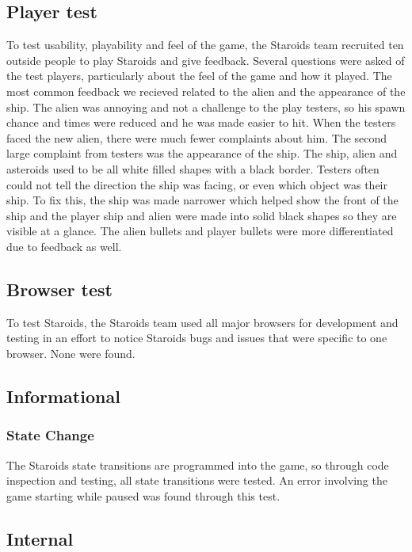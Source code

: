 \documentclass[12pt, titlepage]{article}
\begin{document}
\subsection{Player test}
To test usability, playability and feel of the game, the Staroids team recruited ten outside people to play Staroids and give feedback. Several questions were asked of the test players, particularly about the feel of the game and how it played. The most common feedback we recieved related to the alien and the appearance of the ship. The alien was annoying and not a challenge to the play testers, so his spawn chance and times were reduced and he was made easier to hit. When the testers faced the new alien, there were much fewer complaints about him. The second large complaint from testers was the appearance of the ship. The ship, alien and asteroids used to be all white filled shapes with a black border. Testers often could not tell the direction the ship was facing, or even which object was their ship. To fix this, the ship was made narrower which helped show the front of the ship and the player ship and alien were made into solid black shapes so they are visible at a glance. The alien bullets and player bullets were more differentiated due to feedback as well.\\

\subsection{Browser test}
To test Staroids, the Staroids team used all major browsers for development and testing in an effort to notice Staroids bugs and issues that were specific to one browser. None were found.\\

\subsection{Informational}

\subsubsection{State Change}
The Staroids state transitions are programmed into the game, so through code inspection and testing, all state transitions were tested. An error involving the game starting while paused was found through this test.

\subsection{Internal}
\end{document}
